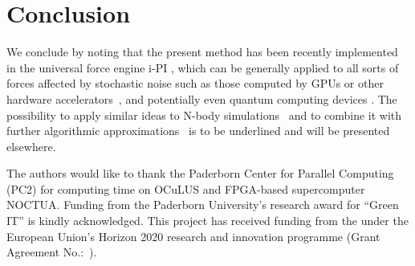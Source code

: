 \documentclass[format=acmsmall,authorversion,nonacm,timestamp,urlbreakonhyphens]{acmart}
\begin{document}
\section{Conclusion}
\label{sec:conclusion}
We conclude by noting that the present method has been recently implemented in the universal force engine i-PI \cite{iPi}, which can be generally applied to all sorts of forces affected by stochastic noise such as those computed by GPUs or other hardware accelerators~\cite{HOOMD, NAMD, OpenMM, HalMD, Lammps, Amber, Gromacs}, and potentially even quantum computing devices \cite{Steane, Knill, Blatt, Chow}. The possibility to apply similar ideas to N-body simulations~\cite{White, Makino} and to combine it with further algorithmic approximations~\cite{LassAC} is to be underlined and will be presented elsewhere.


\begin{acks}
The authors would like to thank the Paderborn Center for Parallel Computing (PC2) for computing time on OCuLUS and FPGA-based supercomputer NOCTUA. Funding from the Paderborn University's research award for ``Green IT'' is kindly acknowledged. This project has received funding from the  under the European Union's Horizon 2020 research and innovation programme (Grant Agreement No.:~).
\end{acks}



\end{document}
